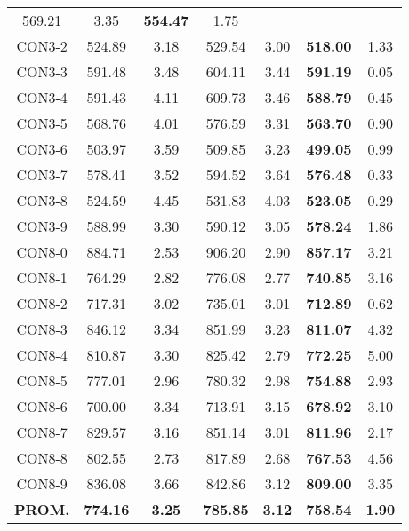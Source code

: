 \begin{table}[ht]
\begin{tabular}{c c c c c c c}
569.21 & 3.35 & \bf{554.47} & 
1.75\\CON3-2 & 524.89 & 3.18 & 
529.54 & 3.00 & \bf{518.00} & 
1.33\\CON3-3 & 591.48 & 3.48 & 
604.11 & 3.44 & \bf{591.19} & 
0.05\\CON3-4 & 591.43 & 4.11 & 
609.73 & 3.46 & \bf{588.79} & 
0.45\\CON3-5 & 568.76 & 4.01 & 
576.59 & 3.31 & \bf{563.70} & 
0.90\\CON3-6 & 503.97 & 3.59 & 
509.85 & 3.23 & \bf{499.05} & 
0.99\\CON3-7 & 578.41 & 3.52 & 
594.52 & 3.64 & \bf{576.48} & 
0.33\\CON3-8 & 524.59 & 4.45 & 
531.83 & 4.03 & \bf{523.05} & 
0.29\\CON3-9 & 588.99 & 3.30 & 
590.12 & 3.05 & \bf{578.24} & 
1.86\\CON8-0 & 884.71 & 2.53 & 
906.20 & 2.90 & \bf{857.17} & 
3.21\\CON8-1 & 764.29 & 2.82 & 
776.08 & 2.77 & \bf{740.85} & 
3.16\\CON8-2 & 717.31 & 3.02 & 
735.01 & 3.01 & \bf{712.89} & 
0.62\\CON8-3 & 846.12 & 3.34 & 
851.99 & 3.23 & \bf{811.07} & 
4.32\\CON8-4 & 810.87 & 3.30 & 
825.42 & 2.79 & \bf{772.25} & 
5.00\\CON8-5 & 777.01 & 2.96 & 
780.32 & 2.98 & \bf{754.88} & 
2.93\\CON8-6 & 700.00 & 3.34 & 
713.91 & 3.15 & \bf{678.92} & 
3.10\\CON8-7 & 829.57 & 3.16 & 
851.14 & 3.01 & \bf{811.96} & 
2.17\\CON8-8 & 802.55 & 2.73 & 
817.89 & 2.68 & \bf{767.53} & 
4.56\\CON8-9 & 836.08 & 3.66 & 
842.86 & 3.12 & \bf{809.00} & 
3.35\\\bf{PROM.} & 
\bf{774.16} & \bf{3.25} & \bf{785.85} & \bf{3.12} & \bf{758.54} & \bf{1.90}\\[1ex]\hline
\end{tabular}
\label{table:nonlin}
\end{table} \clearpage
